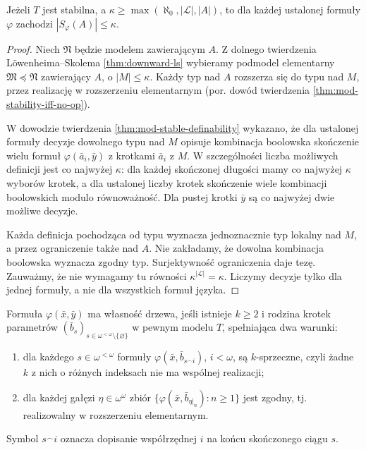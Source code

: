 \begin{lemat}
\label{lem:mod-stable-local-type-count}
Jeżeli $T$ jest stabilna, a
$\kappa\geq\max(\aleph_0,|\mathcal L|,|A|)$,
to dla każdej ustalonej formuły $\varphi$
zachodzi $|S_\varphi(A)|\leq\kappa$.
\end{lemat}
\begin{proof}
Niech $\mathfrak N$ będzie modelem zawierającym $A$.
Z dolnego twierdzenia Löwenheima--Skolema
\ref{thm:downward-ls} wybieramy podmodel
elementarny $\mathfrak M\preccurlyeq\mathfrak N$
zawierający $A$, o $|M|\leq\kappa$.
Każdy typ nad $A$ rozszerza się do typu
nad $M$, przez realizację w rozszerzeniu
elementarnym (por. dowód twierdzenia
\ref{thm:mod-stability-iff-no-op}).

W dowodzie twierdzenia
\ref{thm:mod-stable-definability}
wykazano, że dla ustalonej formuły
decyzje dowolnego typu nad $M$
opisuje kombinacja boolowska skończenie
wielu formuł $\varphi(\bar a_i,\bar y)$
z krotkami $\bar a_i$ z $M$.
W szczególności liczba możliwych definicji
jest co najwyżej $\kappa$:
dla każdej skończonej długości mamy
co najwyżej $\kappa$ wyborów krotek,
a dla ustalonej liczby krotek
skończenie wiele kombinacji boolowskich
modulo równoważność.
Dla pustej krotki $\bar y$ są co najwyżej
dwie możliwe decyzje.

Każda definicja pochodząca od typu wyznacza
jednoznacznie typ lokalny nad $M$, a przez
ograniczenie także nad $A$. Nie zakładamy,
że dowolna kombinacja boolowska wyznacza
zgodny typ.
Surjektywność ograniczenia daje tezę.
Zauważmy, że nie wymagamy tu równości
$\kappa^{|\mathcal L|}=\kappa$.
Liczymy decyzje tylko dla jednej formuły,
a nie dla wszystkich formuł języka.
\end{proof}

\begin{definicja}
\label{def:mod-tree-property}
Formuła $\varphi(\bar x,\bar y)$ ma własność
drzewa, jeśli istnieje $k\geq2$ i rodzina
krotek parametrów
$(\bar b_s)_{s\in\omega^{<\omega}\setminus
\{\varnothing\}}$ w pewnym modelu $T$,
spełniająca dwa warunki:
\begin{enumerate}[label=(\roman*)]
\item dla każdego $s\in\omega^{<\omega}$
formuły $\varphi(\bar x,\bar b_{s^\frown i})$,
$i<\omega$, są $k$-sprzeczne, czyli żadne
$k$ z nich o różnych indeksach nie ma
wspólnej realizacji;
\item dla każdej gałęzi $\eta\in\omega^\omega$
zbiór
$\{\varphi(\bar x,\bar b_{\eta|_n}):n\geq1\}$
jest zgodny, tj. realizowalny w rozszerzeniu
elementarnym.
\end{enumerate}
Symbol $s^\frown i$ oznacza dopisanie
współrzędnej $i$ na końcu skończonego ciągu $s$.
\end{definicja}

